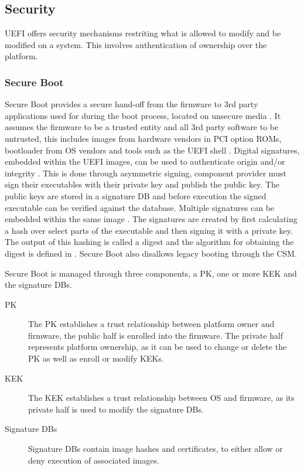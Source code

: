 
\subsection{Security}

\ac{UEFI} offers security mechanisms restriting what is allowed to modify and be modified on a system.
This involves authentication of ownership over the platform.

\subsubsection{Secure Boot}
\label{sec:uefi-pi:uefi:secure-boot}

Secure Boot provides a secure hand-off from the firmware to 3rd party applications used for during the boot process, located on unsecure media \cite{tianocore-understanding-uefi-secure-boot-chain} \cite[Sections 32.2 and 32.5.1]{uefi-spec}.
It assumes the firmware to be a trusted entity and all 3rd party software to be untrusted, this includes images from hardware vendors in \ac{PCI} option \acp{ROM}, bootloader from \ac{OS} vendors and tools such as the \ac{UEFI} shell \cite{tianocore-understanding-uefi-secure-boot-chain}.
Digital signatures, embedded within the \ac{UEFI} images, can be used to authenticate origin and/or integrity \cite[Section 32.2]{uefi-spec}.
This is done through asymmetric signing, component provider must sign their executables with their private key and publish the public key.
The public keys are stored in a signature \ac{DB} and before execution the signed executable can be verified against the database.
Multiple signatures can be embedded within the same image \cite[Section 32.2.2]{uefi-spec}.
The signatures are created by first calculating a hash over select parts of the executable and then signing it with a private key.
The output of this hashing is called a digest and the algorithm for obtaining the digest is defined in \cite{microsoft-pe-signature-format}.
Secure Boot also disallows legacy booting through the \ac{CSM}.

Secure Boot is managed through three components, a \ac{PK}, one or more \ac{KEK} and the signature \acp{DB}.

\begin{description}
    \item[\ac{PK}]
        The \ac{PK} establishes a trust relationship between platform owner and firmware, the public half is enrolled into the firmware.
        The private half represents platform ownership, as it can be used to change or delete the \ac{PK} as well as enroll or modify \acp{KEK}.
    \item[\ac{KEK}]
        The \ac{KEK} establishes a trust relationship between \ac{OS} and firmware, as its private half is used to modify the signature \acp{DB}.
    \item[Signature \acfp{DB}]
        Signature \acp{DB} contain image hashes and certificates, to either allow or deny execution of associated images.
\end{description}

